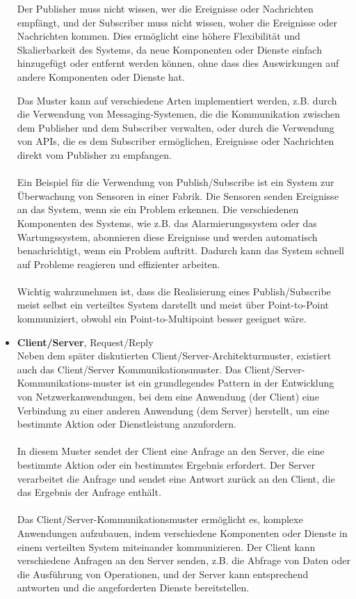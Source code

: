 \documentclass[../vs-script-first-v01.tex]{subfiles}
\begin{document}
\begin{itemize}
Der Publisher muss nicht wissen, wer die Ereignisse oder Nachrichten empfängt, und der Subscriber muss nicht wissen, woher die Ereignisse oder Nachrichten kommen. Dies ermöglicht eine höhere Flexibilität und Skalierbarkeit des Systems, da neue Komponenten oder Dienste einfach hinzugefügt oder entfernt werden können, ohne dass dies Auswirkungen auf andere Komponenten oder Dienste hat.

Das Muster kann auf verschiedene Arten implementiert werden, z.B. durch die Verwendung von Messaging-Systemen, die die Kommunikation zwischen dem Publisher und dem Subscriber verwalten, oder durch die Verwendung von APIs, die es dem Subscriber ermöglichen, Ereignisse oder Nachrichten direkt vom Publisher zu empfangen.
\\\\
Ein Beispiel für die Verwendung von Publish/Subscribe ist ein System zur Überwachung von Sensoren in einer Fabrik. Die Sensoren senden Ereignisse an das System, wenn sie ein Problem erkennen. Die verschiedenen Komponenten des Systems, wie z.B. das Alarmierungssystem oder das Wartungssystem, abonnieren diese Ereignisse und werden automatisch benachrichtigt, wenn ein Problem auftritt. Dadurch kann das System schnell auf Probleme reagieren und effizienter arbeiten.
\\\\
Wichtig wahrzunehmen ist, dass die Realisierung eines Publish/Subscribe meist selbst ein verteiltes System darstellt und meist über Point-to-Point kommuniziert, obwohl ein Point-to-Multipoint besser geeignet wäre.
\item \textbf{Client/Server}, Request/Reply\\
Neben dem später diskutierten Client/Server-Architekturmuster, existiert auch das Client/Server Kommunikationsmuster. Das Client/Server-Kommunikations-muster ist ein grundlegendes Pattern in der Entwicklung von Netzwerkanwendungen, bei dem eine Anwendung (der Client) eine Verbindung zu einer anderen Anwendung (dem Server) herstellt, um eine bestimmte Aktion oder Dienstleistung anzufordern.
\\\\
In diesem Muster sendet der Client eine Anfrage an den Server, die eine bestimmte Aktion oder ein bestimmtes Ergebnis erfordert. Der Server verarbeitet die Anfrage und sendet eine Antwort zurück an den Client, die das Ergebnis der Anfrage enthält.
\\\\
Das Client/Server-Kommunikationsmuster ermöglicht es, komplexe Anwendungen aufzubauen, indem verschiedene Komponenten oder Dienste in einem verteilten System miteinander kommunizieren. Der Client kann verschiedene Anfragen an den Server senden, z.B. die Abfrage von Daten oder die Ausführung von Operationen, und der Server kann entsprechend antworten und die angeforderten Dienste bereitstellen.

\end{itemize}
\end{document}
